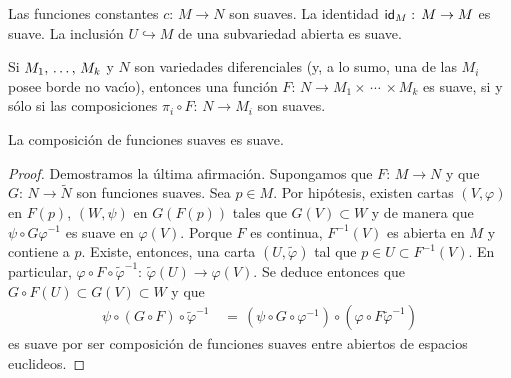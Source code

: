 \begin{propoAlgunasFuncionesSuaves}\label{thm:algunassuaves}
	Las funciones constantes $c:\,M\rightarrow N$ son suaves. La
	identidad $\id[M]:\,M\rightarrow M$ es suave. La inclusi\'{o}n
	$U\hookrightarrow M$ de una subvariedad abierta es suave.

	Si $\lista{M}{k}$ y $N$ son variedades diferenciales (y, a lo sumo,
	una de las $M_{i}$ posee borde no vac\'{\i}o), entonces una
	funci\'{o}n $F:\,N\rightarrow M_{1}\times\,\cdots\,\times M_{k}$
	es suave, si y s\'{o}lo si las composiciones
	$\pi_{i}\circ F:\,N\rightarrow M_{i}$ son suaves.

	La composici\'{o}n de funciones suaves es suave.
\end{propoAlgunasFuncionesSuaves}

\begin{proof}
	Demostramos la \'{u}ltima afirmaci\'{o}n.
	Supongamos que $F:\,M\rightarrow N$ y que $G:\,N\rightarrow\tilde{N}$
	son funciones suaves. Sea $p\in M$. Por hip\'{o}tesis, existen cartas
	$(V,\varphi)$ en $F(p)$, $(W,\psi)$ en $G(F(p))$ tales que
	$G(V)\subset W$ y de manera que $\psi\circ G\varphi^{-1}$ es suave
	en $\varphi(V)$. Porque $F$ es continua, $F^{-1}(V)$ es abierta en
	$M$ y contiene a $p$. Existe, entonces, una carta $(U,\tilde{\varphi})$
	tal que $p\in U\subset F^{-1}(V)$. En particular,
	$\varphi\circ F\circ\tilde{\varphi}^{-1}:%
		\,\tilde{\varphi}(U)\rightarrow\varphi(V)$. Se deduce entonces
	que $G\circ F(U)\subset G(V)\subset W$ y que
	\begin{align*}
		\psi\circ(G\circ F)\circ\tilde{\varphi}^{-1} & \,=\,
			(\psi\circ G\circ\varphi^{-1})\circ
			(\varphi\circ F\tilde{\varphi}^{-1})
	\end{align*}
	es suave por ser composici\'{o}n de funciones suaves entre abiertos
	de espacios euclideos.
\end{proof}
